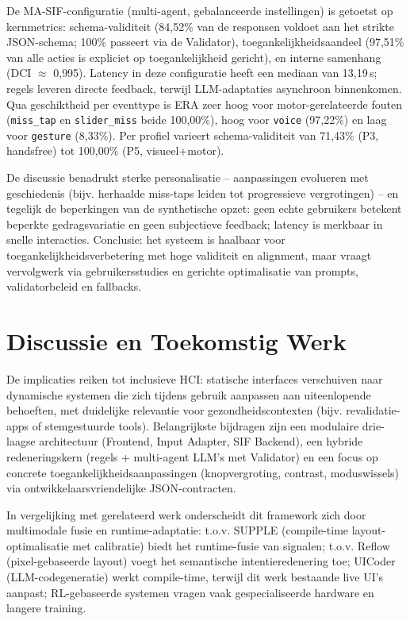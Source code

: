 \documentclass[openany]{book}
\begin{document}
De MA-SIF-configuratie (multi-agent, gebalanceerde instellingen) is getoetst op kernmetrics: schema-validiteit (84{,}52\% van de responsen voldoet aan het strikte JSON-schema; 100\% passeert via de Validator), toegankelijkheidsaandeel (97{,}51\% van alle acties is expliciet op toegankelijkheid gericht), en interne samenhang (DCI $\approx$ 0{,}995). Latency in deze configuratie heeft een mediaan van 13{,}19\,s; regels leveren directe feedback, terwijl LLM-adaptaties asynchroon binnenkomen. Qua geschiktheid per eventtype is ERA zeer hoog voor motor-gerelateerde fouten (\texttt{miss\_tap} en \texttt{slider\_miss} beide 100{,}00\%), hoog voor \texttt{voice} (97{,}22\%) en laag voor \texttt{gesture} (8{,}33\%). Per profiel varieert schema-validiteit van 71{,}43\% (P3, handsfree) tot 100{,}00\% (P5, visueel+motor).

De discussie benadrukt sterke personalisatie – aanpassingen evolueren met geschiedenis (bijv. herhaalde miss-taps leiden tot progressieve vergrotingen) – en tegelijk de beperkingen van de synthetische opzet: geen echte gebruikers betekent beperkte gedragsvariatie en geen subjectieve feedback; latency is merkbaar in snelle interacties. Conclusie: het systeem is haalbaar voor toegankelijkheidsverbetering met hoge validiteit en alignment, maar vraagt vervolgwerk via gebruikersstudies en gerichte optimalisatie van prompts, validatorbeleid en fallbacks.

\section*{Discussie en Toekomstig Werk}
De implicaties reiken tot inclusieve HCI: statische interfaces verschuiven naar dynamische systemen die zich tijdens gebruik aanpassen aan uiteenlopende behoeften, met duidelijke relevantie voor gezondheidscontexten (bijv. revalidatie-apps of stemgestuurde tools). Belangrijkste bijdragen zijn een modulaire drie-laagse architectuur (Frontend, Input Adapter, SIF Backend), een hybride redeneringskern (regels + multi-agent LLM’s met Validator) en een focus op concrete toegankelijkheidsaanpassingen (knopvergroting, contrast, moduswissels) via ontwikkelaarsvriendelijke JSON-contracten.

In vergelijking met gerelateerd werk onderscheidt dit framework zich door multimodale fusie en runtime-adaptatie: t.o.v. SUPPLE (compile-time layout-optimalisatie met calibratie) biedt het runtime-fusie van signalen; t.o.v. Reflow (pixel-gebaseerde layout) voegt het semantische intentieredenering toe; UICoder (LLM-codegeneratie) werkt compile-time, terwijl dit werk bestaande live UI’s aanpast; RL-gebaseerde systemen vragen vaak gespecialiseerde hardware en langere training. 
\end{document}
